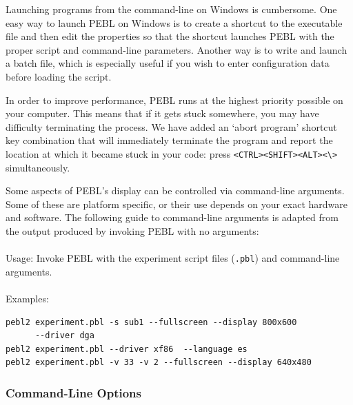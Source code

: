 Launching programs from the command-line on Windows is cumbersome.
One easy way to launch PEBL on Windows is to create a shortcut to the
executable file and then edit the properties so that the shortcut
launches PEBL with the proper script and command-line parameters.
Another way is to write and launch a batch file, which is especially
useful if you wish to enter configuration data before loading the
script.



In order to improve performance, PEBL runs at the highest
priority possible on your computer.  This means that if it
gets stuck somewhere, you may have difficulty terminating the
process.  We have added an `abort program' shortcut key
combination that will immediately terminate the program and
report the location at which it became stuck in your code: \newline press \verb+<CTRL><SHIFT><ALT><\>+ simultaneously.
  

\label{sec:2.5}
Some aspects of PEBL's display can be controlled via
command-line arguments.  Some of these are platform
specific, or their use depends on your exact hardware and
software. The following guide to command-line
arguments is adapted from the output produced by
invoking PEBL  with no arguments:\\
\\
Usage:  Invoke PEBL with the experiment script files (\texttt{.pbl})
and  command-line arguments.\\
\\
Examples:
\begin{verbatim}
pebl2 experiment.pbl -s sub1 --fullscreen --display 800x600
      --driver dga
pebl2 experiment.pbl --driver xf86  --language es
pebl2 experiment.pbl -v 33 -v 2 --fullscreen --display 640x480 
\end{verbatim}
 
\subsubsection{Command-Line Options}

